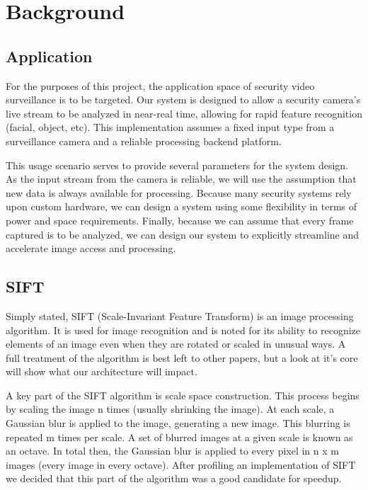 \section{Background}
\subsection{Application}
For the purposes of this project, the application space of security video surveillance is to be targeted. Our system is designed to allow a security camera's live stream to be analyzed in near-real time, allowing for rapid feature recognition (facial, object, etc). This implementation assumes a fixed input type from a surveillance camera and a reliable processing backend platform.

This usage scenario serves to provide several parameters for the system design. As the input stream from the camera is reliable, we will use the assumption that new data is always available for processing. Because many security systems rely upon custom hardware, we can design a system using some flexibility in terms of power and space requirements. Finally, because we can assume that every frame captured is to be analyzed, we can design our system to explicitly streamline and accelerate image access and processing.

\subsection{SIFT}
Simply stated, SIFT (Scale-Invariant Feature Transform) is an image processing algorithm. It is used for image recognition and is noted for its ability to recognize elements of an image even when they are rotated or scaled in unusual ways. A full treatment of the algorithm is best left to other papers, but a look at it's core will show what our architecture will impact.

A key part of the SIFT algorithm is scale space construction. This process begins by scaling the image n times (usually shrinking the image). At each scale, a Gaussian blur is applied to the image, generating a new image. This blurring is repeated m times per scale. A set of blurred images at a given scale is known as an octave. In total then, the Gaussian blur is applied to every pixel in n x m images (every image in every octave). After profiling an implementation of SIFT we decided that this part of the algorithm was a good candidate for speedup.


